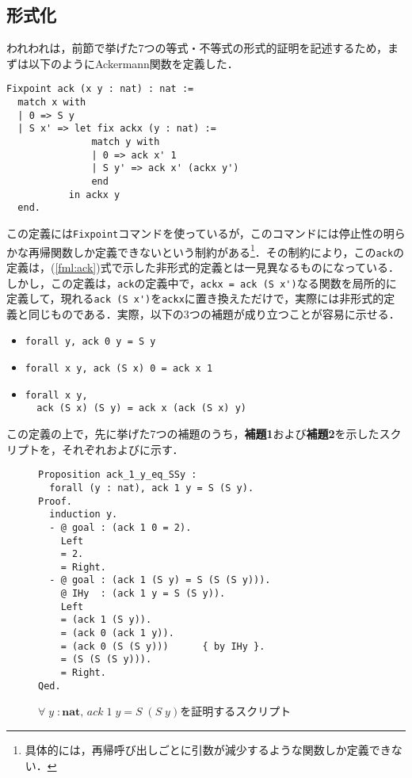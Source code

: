 \documentclass[submit]{ipsj}
\begin{document}
\subsection{形式化}

われわれは，前節で挙げた7つの等式・不等式の形式的証明を記述するため，まずは以下のようにAckermann関数を定義した．
\begin{mdframed}[leftmargin=10pt, rightmargin=10pt, skipabove=10pt, skipbelow=10pt]
\begin{verbatim}
Fixpoint ack (x y : nat) : nat :=
  match x with
  | 0 => S y
  | S x' => let fix ackx (y : nat) :=
               match y with
               | 0 => ack x' 1
               | S y' => ack x' (ackx y')
               end
           in ackx y
  end.
\end{verbatim}
\end{mdframed}
この定義には\verb+Fixpoint+コマンドを使っているが，このコマンドには停止性の明らかな再帰関数しか定義できないという制約がある\footnote{具体的には，再帰呼び出しごとに引数が減少するような関数しか定義できない．}．その制約により，この\verb+ack+の定義は，(\ref{fml:ack})式で示した非形式的定義とは一見異なるものになっている．しかし，この定義は，\verb+ack+の定義中で，\verb+ackx = ack (S x')+なる関数を局所的に定義して，現れる\verb+ack (S x')+を\verb+ackx+に置き換えただけで，実際には非形式的定義と同じものである．実際，以下の3つの補題が成り立つことが容易に示せる．
\begin{itemize}
\item \verb+forall y, ack 0 y = S y+
\item \verb+forall x y, ack (S x) 0 = ack x 1+
\item \verb+forall x y,+\\\verb+  ack (S x) (S y) = ack x (ack (S x) y)+
\end{itemize}
この定義の上で，先に挙げた7つの補題のうち，{\gtfamily\bfseries 補題1}および{\gtfamily\bfseries 補題2}を示したスクリプトを，それぞれおよびに示す．
\begin{figure}[t]
\begin{mdframed}
\begin{verbatim}
Proposition ack_1_y_eq_SSy :
  forall (y : nat), ack 1 y = S (S y).
Proof.
  induction y.
  - @ goal : (ack 1 0 = 2).
    Left
    = 2.
    = Right.
  - @ goal : (ack 1 (S y) = S (S (S y))).
    @ IHy  : (ack 1 y = S (S y)).
    Left
    = (ack 1 (S y)).
    = (ack 0 (ack 1 y)).
    = (ack 0 (S (S y)))      { by IHy }.
    = (S (S (S y))).
    = Right.
Qed.
\end{verbatim}
\end{mdframed}
\caption{$\forall \; y\; : \mathbf{nat}, \, \mathit{ack}\;1\;y = S\;(S\;y)$を証明するスクリプト}\label{fig:lem_script1}
\end{figure}
\end{document}
